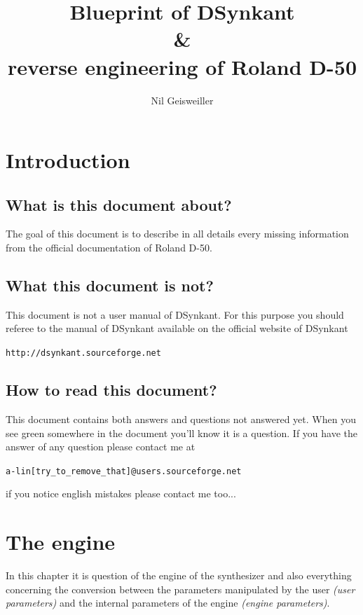 \documentclass[11pt]{report}
\title{Blueprint of DSynkant\\
  \&\\
  reverse engineering of Roland D-50}
\author{Nil Geisweiller}
\newcommand{\question}[1]{{\color{Green}#1}}
\begin{document}
\maketitle

\tableofcontents

\chapter{Introduction}

\section{What is this document about?}

The goal of this document is to describe in all details every missing
information from the official documentation of Roland D-50.

\section{What this document is not?}

This document is not a user manual of DSynkant. For this purpose you should 
referee to the manual of DSynkant available on the official website of
DSynkant\\
\begin{center}\texttt{http://dsynkant.sourceforge.net}\end{center}

\section{How to read this document?}

This document contains both answers and questions not answered yet.
When you see \question{green} somewhere in the document you'll know it is a question.
If you have the answer of any
question please contact me at\\
\begin{center}\texttt{a-lin{\color{Red}[try\_to\_remove\_that]}@users.sourceforge.net}
\end{center}
{\tiny if you notice english mistakes please contact me too...}

\chapter{The engine}
In this chapter it is question of the engine of the synthesizer and also
everything concerning the conversion between the parameters manipulated by
the user \emph{(user parameters)}
and the internal parameters of the engine \emph{(engine parameters)}.
\end{document}
